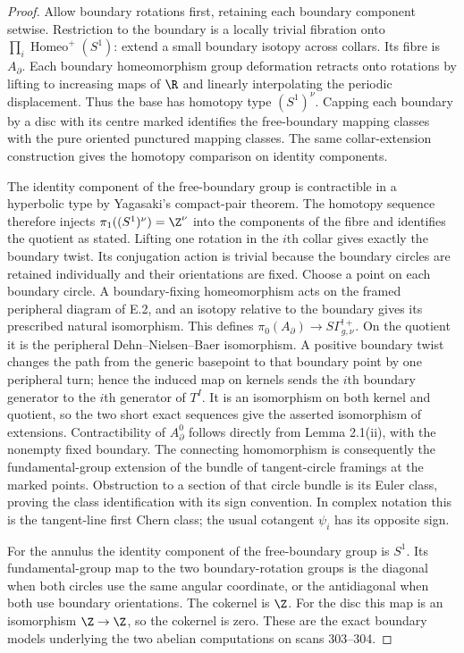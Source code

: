 \begin{proof}
Allow boundary rotations first, retaining each boundary component
setwise. Restriction to the boundary is a locally trivial fibration
onto $\prod_i\operatorname{Homeo}^+(S^1)$: extend a small boundary
isotopy across collars. Its fibre is $A_\partial$.
Each boundary homeomorphism group deformation retracts onto rotations
by lifting to increasing maps of $\R$ and linearly interpolating the
periodic displacement. Thus the base has homotopy type $(S^1)^\nu$.
Capping each boundary by a disc with its centre marked identifies the
free-boundary mapping classes with the pure oriented punctured mapping
classes. The same collar-extension construction gives the homotopy
comparison on identity components.

The identity component of the free-boundary group is contractible in
a hyperbolic type by Yagasaki's compact-pair theorem. The homotopy
sequence therefore injects $\pi_1((S^1)^\nu)=\Z^\nu$ into the
components of the fibre and identifies the quotient as stated. Lifting
one rotation in the $i$th collar gives exactly the boundary twist.
Its conjugation action is trivial because the boundary circles are
retained individually and their orientations are fixed. Choose a point
on each boundary circle. A boundary-fixing homeomorphism acts on the
framed peripheral diagram of E.2, and an isotopy relative to the
boundary gives its prescribed natural isomorphism. This defines
$\pi_0(A_\partial)\to S\Gamma^{!+}_{g,\nu}$. On the quotient it is
the peripheral Dehn--Nielsen--Baer isomorphism. A positive boundary
twist changes the path from the generic basepoint to that boundary
point by one peripheral turn; hence the induced map on kernels sends
the $i$th boundary generator to the $i$th generator of $T^I$.
It is an isomorphism on both kernel and quotient, so the two short
exact sequences give the asserted isomorphism of extensions.
Contractibility of $A_\partial^0$ follows directly from Lemma 2.1(ii),
with the nonempty fixed boundary. The connecting homomorphism is consequently the
fundamental-group extension of the bundle of tangent-circle framings
at the marked points. Obstruction to a section of that circle bundle
is its Euler class, proving the class identification with its sign
convention. In complex notation this is the tangent-line first Chern
class; the usual cotangent $\psi_i$ has its opposite sign.

For the annulus the identity component of the free-boundary group is
$S^1$. Its fundamental-group map to the two boundary-rotation groups
is the diagonal when both circles use the same angular coordinate,
or the antidiagonal when both use boundary orientations. The cokernel
is $\Z$. For the disc this map is an isomorphism $\Z\to\Z$, so the
cokernel is zero. These are the exact boundary models underlying the
two abelian computations on scans 303--304.
\end{proof}

